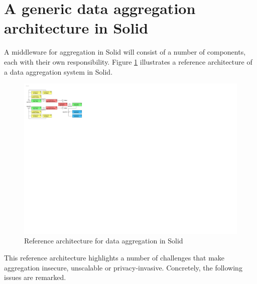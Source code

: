 \newpage

\section{A generic data aggregation architecture in Solid}
\label{sec:generic-agg-arch}
A middleware for aggregation in Solid will consist of a number of components, each with their own responsibility. Figure \ref{fig:reference-architecture} illustrates a reference architecture of a data aggregation system in Solid. 

\begin{figure}[h]
    \centering
    \includegraphics[width=1.0\textwidth]{images/architecture/Reference-Architecture-Aggregator.pdf}
    \caption{Reference architecture for data aggregation in Solid}
    \label{fig:reference-architecture}
\end{figure}

\noindent This reference architecture highlights a number of challenges that make aggregation insecure, unscalable or privacy-invasive. Concretely, the following issues are remarked.

